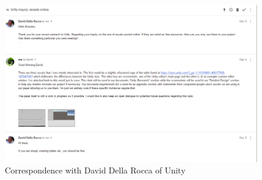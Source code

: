 \documentclass[12pt]{article}
\begin{document}
\begin{figure}
\centering
\includegraphics{Pictures/unityCorrespondence.png}
\caption{Correspondence with David Della Rocca of Unity}
\end{figure}



\printbibliography[title=References]
\end{document}
